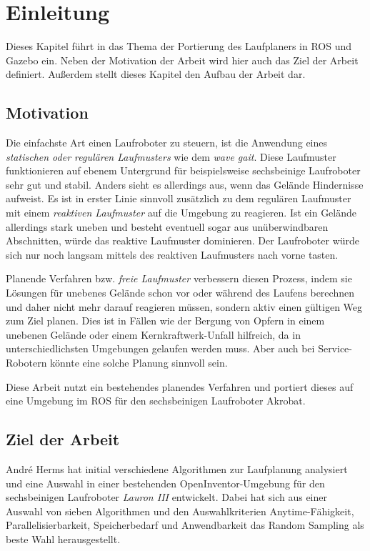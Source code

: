 \chapter{Einleitung}
\label{kap1}

Dieses Kapitel führt in das Thema der Portierung des Laufplaners in \ac{ROS} und Gazebo ein. Neben der Motivation der Arbeit wird hier auch das Ziel der Arbeit definiert. Außerdem stellt dieses Kapitel den Aufbau der Arbeit dar. 

\section{Motivation}

Die einfachste Art einen Laufroboter zu steuern, ist die Anwendung eines \emph{statischen oder regulären Laufmusters} wie dem \emph{wave gait}. Diese Laufmuster funktionieren auf ebenem Untergrund für beispielsweise sechsbeinige Laufroboter sehr gut und stabil. Anders sieht es allerdings aus, wenn das Gelände Hindernisse aufweist. Es ist in erster Linie sinnvoll zusätzlich zu dem regulären Laufmuster mit einem \emph{reaktiven Laufmuster} auf die Umgebung zu reagieren. Ist ein Gelände allerdings stark uneben und besteht eventuell sogar aus unüberwindbaren Abschnitten, würde das reaktive Laufmuster dominieren. Der Laufroboter würde sich nur noch langsam mittels des reaktiven Laufmusters nach vorne tasten.

Planende Verfahren bzw. \emph{freie Laufmuster} verbessern diesen Prozess, indem sie Lösungen für unebenes Gelände schon vor oder während des Laufens berechnen und daher nicht mehr darauf reagieren müssen, sondern aktiv einen gültigen Weg zum Ziel planen. Dies ist in Fällen wie der Bergung von Opfern in einem unebenen Gelände oder einem Kernkraftwerk-Unfall hilfreich, da in unterschiedlichsten Umgebungen gelaufen werden muss. Aber auch bei Service-Robotern könnte eine solche Planung sinnvoll sein.

Diese Arbeit nutzt ein bestehendes planendes Verfahren und portiert dieses auf eine Umgebung im \ac{ROS} für den sechsbeinigen Laufroboter Akrobat.

\section{Ziel der Arbeit}

André Herms \autocite{herms2004} hat initial verschiedene Algorithmen zur Laufplanung analysiert und eine Auswahl in einer bestehenden OpenInventor-Umgebung \autocite{inventor} für den sechsbeinigen Laufroboter \emph{Lauron III} entwickelt. Dabei hat sich aus einer Auswahl von sieben Algorithmen und den Auswahlkriterien Anytime-Fähigkeit, Parallelisierbarkeit, Speicherbedarf und Anwendbarkeit das Random Sampling als beste Wahl herausgestellt.

